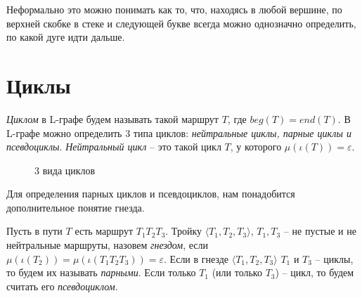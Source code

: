 \begin{figure}[h]
    \begin{minipage}[h]{0.49\linewidth}
    \end{minipage}
    \hfill
    \begin{minipage}[h]{0.49\linewidth}
    \end{minipage}
    \label{det_vs_nondet}  
  \end{figure}

Неформально это можно понимать как то, что, находясь в любой вершине, 
по верхней скобке в стеке и следующей букве всегда можно однозначно определить, по какой дуге идти дальше.

\section{Циклы}

\emph{Циклом} в L-графе будем называть такой маршрут $T$, где $beg(T) = end(T)$. 
В L-графе можно определить 3 типа циклов: \emph{нейтральные циклы, парные циклы и псевдоциклы}.
\emph{Нейтральный цикл} -- это такой цикл $T$, у которого $\mu(\iota(T)) = \varepsilon$.

\begin{figure}
    \centering
    \qquad
    \qquad
    \caption{3 вида циклов}
    \label{loop-kinds-example}
\end{figure}


Для определения парных циклов и псевдоциклов, нам понадобится дополнительное понятие гнезда.

Пусть в пути $T$ есть маршрут $T_1 T_2 T_3$. 
Тройку $\langle T_1, T_2, T_3 \rangle$, $T_1, T_3$ -- не пустые и не нейтральные маршруты, назовем \emph{гнездом}, 
если $\mu(\iota(T_2)) = \mu(\iota(T_1 T_2 T_3)) = \varepsilon$.
Если в гнезде $\langle T_1, T_2, T_3 \rangle$ $T_1$ и $T_3$ -- циклы, то будем их называть \emph{парными}.
Если только $T_1$ (или только $T_3$) -- цикл, то будем считать его \emph{псевдоциклом}.

